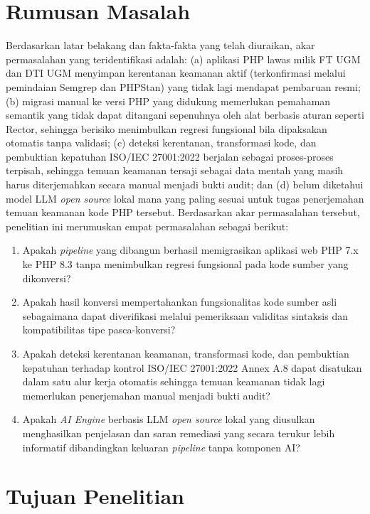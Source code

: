 \section{Rumusan Masalah}
\label{sec:rumusan-masalah}

Berdasarkan latar belakang dan fakta-fakta yang telah diuraikan, akar permasalahan yang teridentifikasi adalah: (a) aplikasi PHP lawas milik FT UGM dan DTI UGM menyimpan kerentanan keamanan aktif (terkonfirmasi melalui pemindaian Semgrep dan PHPStan) yang tidak lagi mendapat pembaruan resmi; (b) migrasi manual ke versi PHP yang didukung memerlukan pemahaman semantik yang tidak dapat ditangani sepenuhnya oleh alat berbasis aturan seperti Rector, sehingga berisiko menimbulkan regresi fungsional bila dipaksakan otomatis tanpa validasi; (c) deteksi kerentanan, transformasi kode, dan pembuktian kepatuhan ISO/IEC 27001:2022 berjalan sebagai proses-proses terpisah, sehingga temuan keamanan tersaji sebagai data mentah yang masih harus diterjemahkan secara manual menjadi bukti audit; dan (d) belum diketahui model LLM \textit{open source} lokal mana yang paling sesuai untuk tugas penerjemahan temuan keamanan kode PHP tersebut. Berdasarkan akar permasalahan tersebut, penelitian ini merumuskan empat permasalahan sebagai berikut:

\begin{enumerate}
    \item Apakah \textit{pipeline} yang dibangun berhasil memigrasikan
    aplikasi web PHP 7.x ke PHP 8.3 tanpa menimbulkan regresi
    fungsional pada kode sumber yang dikonversi?
    \item Apakah hasil konversi mempertahankan fungsionalitas kode
    sumber asli sebagaimana dapat diverifikasi melalui pemeriksaan
    validitas sintaksis dan kompatibilitas tipe pasca-konversi?
    \item Apakah deteksi kerentanan keamanan, transformasi kode, dan
    pembuktian kepatuhan terhadap kontrol ISO/IEC 27001:2022 Annex A.8
    dapat disatukan dalam satu alur kerja otomatis sehingga temuan
    keamanan tidak lagi memerlukan penerjemahan manual menjadi bukti
    audit?
    \item Apakah \textit{AI Engine} berbasis LLM \textit{open source}
    lokal yang diusulkan menghasilkan penjelasan dan saran remediasi
    yang secara terukur lebih informatif dibandingkan keluaran
    \textit{pipeline} tanpa komponen AI?
\end{enumerate}

\section{Tujuan Penelitian}
\label{sec:tujuan-penelitian}

